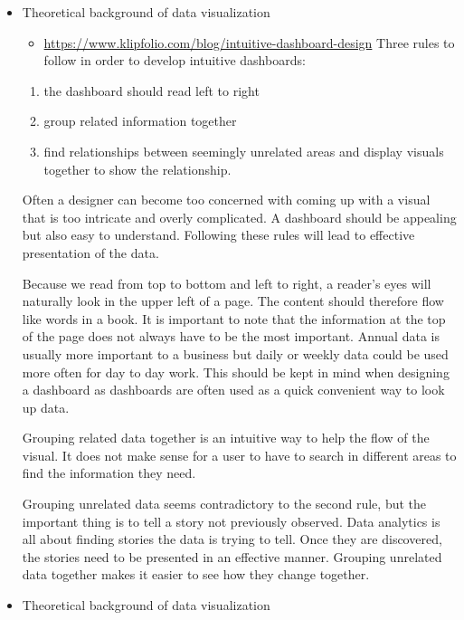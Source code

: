 \documentclass[]{book}
\providecommand{\tightlist}{%
  \setlength{\itemsep}{0pt}\setlength{\parskip}{0pt}}
\theoremstyle{definition}
\theoremstyle{definition}
\theoremstyle{definition}
\theoremstyle{remark}
\begin{document}
\begin{itemize}
\item
  Theoretical background of data visualization

  \begin{itemize}
  \tightlist
  \item
    \url{https://www.klipfolio.com/blog/intuitive-dashboard-design}
    Three rules to follow in order to develop intuitive dashboards:
  \end{itemize}

  \begin{enumerate}
  \def\labelenumi{\arabic{enumi}.}
  \tightlist
  \item
    the dashboard should read left to right
  \item
    group related information together
  \item
    find relationships between seemingly unrelated areas and display
    visuals together to show the relationship.
  \end{enumerate}

  Often a designer can become too concerned with coming up with a visual
  that is too intricate and overly complicated. A dashboard should be
  appealing but also easy to understand. Following these rules will lead
  to effective presentation of the data.

  Because we read from top to bottom and left to right, a reader's eyes
  will naturally look in the upper left of a page. The content should
  therefore flow like words in a book. It is important to note that the
  information at the top of the page does not always have to be the most
  important. Annual data is usually more important to a business but
  daily or weekly data could be used more often for day to day work.
  This should be kept in mind when designing a dashboard as dashboards
  are often used as a quick convenient way to look up data.

  Grouping related data together is an intuitive way to help the flow of
  the visual. It does not make sense for a user to have to search in
  different areas to find the information they need.

  Grouping unrelated data seems contradictory to the second rule, but
  the important thing is to tell a story not previously observed. Data
  analytics is all about finding stories the data is trying to tell.
  Once they are discovered, the stories need to be presented in an
  effective manner. Grouping unrelated data together makes it easier to
  see how they change together.
\item
  Theoretical background of data visualization


\end{itemize}
\end{document}
